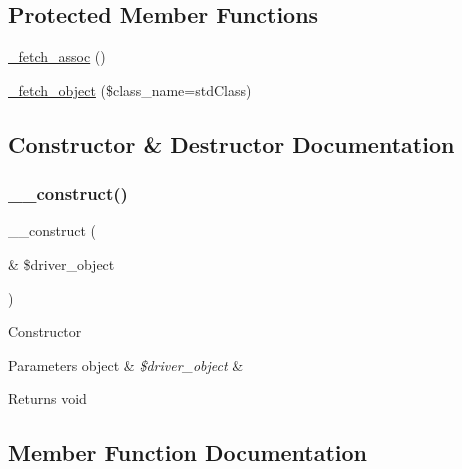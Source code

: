 \subsection*{Protected Member Functions}
\begin{DoxyCompactItemize}
\item 
\mbox{\hyperlink{class_c_i___d_b__result_a43a9a92817f1334a1c10752ec44275a0}{\+\_\+fetch\+\_\+assoc}} ()
\item 
\mbox{\hyperlink{class_c_i___d_b__result_a60806be6a9c2488820813c2a7f4fef71}{\+\_\+fetch\+\_\+object}} (\$class\+\_\+name=\textquotesingle{}std\+Class\textquotesingle{})
\end{DoxyCompactItemize}


\subsection{Constructor \& Destructor Documentation}
\mbox{\label{class_c_i___d_b__result_a8e093c8b6e5733bc3f306385ee426ab7}} 
\subsubsection{\texorpdfstring{\+\_\+\+\_\+construct()}{\_\_construct()}}
{\footnotesize\ttfamily \+\_\+\+\_\+construct (\begin{DoxyParamCaption}\item[{\&}]{\$driver\+\_\+object }\end{DoxyParamCaption})}

Constructor


\begin{DoxyParams}[1]{Parameters}
object & {\em \$driver\+\_\+object} & \\
\hline
\end{DoxyParams}
\begin{DoxyReturn}{Returns}
void 
\end{DoxyReturn}


\subsection{Member Function Documentation}
\mbox{\label{class_c_i___d_b__result_a43a9a92817f1334a1c10752ec44275a0}} 
